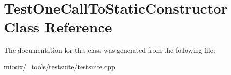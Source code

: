 \hypertarget{class_test_one_call_to_static_constructor}{\section{Test\-One\-Call\-To\-Static\-Constructor Class Reference}
\label{class_test_one_call_to_static_constructor}
}


The documentation for this class was generated from the following file\-:\begin{DoxyCompactItemize}
\item 
miosix/\-\_\-tools/testsuite/testsuite.\-cpp\end{DoxyCompactItemize}
